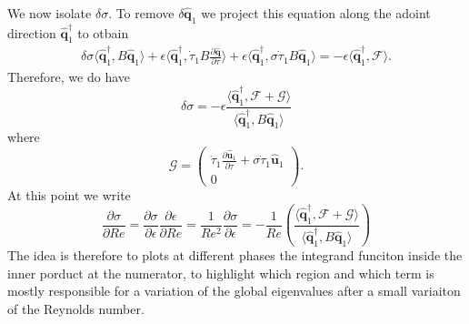 We now isolate $\delta \sigma$. To remove $\delta \hat{\bm{q}}_1$ we project this equation along the adoint direction $\hat{\bm{q}}_1^\dagger$ to otbain
%
\begin{equation}
  \begin{gathered}
  \delta \sigma \langle \hat{\bm{q}}_1^\dagger, B \hat{\bm{q}}_1 \rangle +
  \epsilon \langle \hat{\bm{q}}_1^\dagger, \dot{\tau}_1 B \frac{\partial \hat{\bm{q}} }{\partial \tau} \rangle +
  \epsilon \langle \hat{\bm{q}}_1^\dagger, \sigma \dot{\tau}_1 B \hat{\bm{q}}_1 \rangle =  
  - \epsilon \langle \hat{\bm{q}}_1^\dagger, \mathcal{F} \rangle.
  \end{gathered}
\end{equation}
%
Therefore, we do have
%
\begin{equation}
  \delta \sigma = - \epsilon \frac{ \langle \hat{\bm{q}}_1^\dagger, \mathcal{F}  + \mathcal{G} \rangle }
                                  { \langle \hat{\bm{q}}_1^\dagger, B \hat{\bm{q}}_1 \rangle }
\end{equation}
%
where 
%
\begin{equation}
  \mathcal{G} = \begin{pmatrix} \dot{\tau}_1 \frac{\partial \hat{\bm{u}}_1}{\partial \tau} + \sigma \dot{\tau}_1 \hat{\bm{u}}_1 \\ 0 \end{pmatrix}.
\end{equation}
%
At this point we write
%
\begin{equation}
  \frac{\partial \sigma}{\partial Re} = 
  \frac{\partial \sigma}{\partial \epsilon} \frac{\partial \epsilon}{\partial Re} = 
  \frac{1}{Re^2} \frac{\partial \sigma}{\partial \epsilon} = 
  - \frac{1}{Re} \left( \frac{ \langle \hat{\bm{q}}_1^\dagger, \mathcal{F}  + \mathcal{G} \rangle }
                                  { \langle \hat{\bm{q}}_1^\dagger, B \hat{\bm{q}}_1 \rangle } \right)
\end{equation}
%
The idea is therefore to plots at different phases the integrand funciton inside the inner porduct at the numerator, to highlight which region and which term is mostly responsible for a variation of the global eigenvalues after a small variaiton of the Reynolds number.
